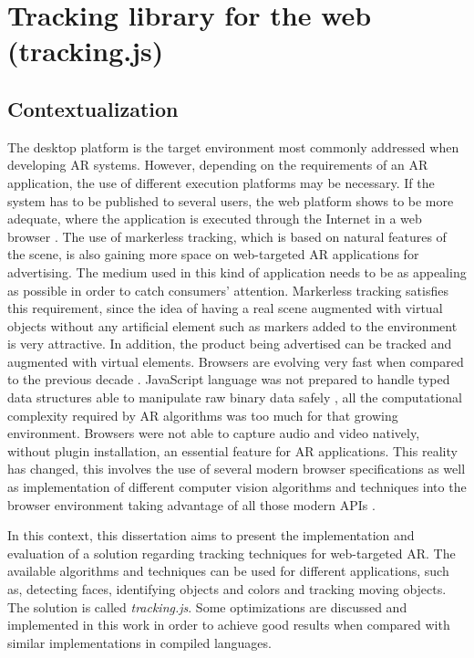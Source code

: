 \chapter{Tracking library for the web (tracking.js)} %
\label{cha:tracking_library_for_the_web}

\section{Contextualization} %
\label{sec:tracking_library_for_the_web:Contextualization}

The desktop platform is the target environment most commonly addressed when developing AR systems. However, depending on the requirements of an AR application, the use of different execution platforms may be necessary. If the system has to be published to several users, the web platform shows to be more adequate, where the application is executed through the Internet in a web browser \cite{Pablo2013}.
The use of markerless tracking, which is based on natural features of the scene, is also gaining more space on web-targeted AR applications for advertising. The medium used in this kind of application needs to be as appealing as possible in order to catch consumers' attention. Markerless tracking satisfies this requirement, since the idea of having a real scene augmented with virtual objects without any artificial element such as markers added to the environment is very attractive. In addition, the product being advertised can be tracked and augmented with virtual elements.
Browsers are evolving very fast when compared to the previous decade \cite{Hickson2013}. JavaScript language was not prepared to handle typed data structures \cite{TypedArray2013} able to manipulate raw binary data safely \cite{Canvas2013}, all the computational complexity required by AR algorithms was too much for that growing environment. Browsers were not able to capture audio and video \cite{MediaCapture2013,WebRTC2013} natively, without plugin installation, an essential feature for AR applications. This reality has changed, this involves the use of several modern browser specifications as well as implementation of different computer vision algorithms and techniques into the browser environment taking advantage of all those modern APIs \cite{Hickson2013,WC2006}.

In this context, this dissertation aims to present the implementation and evaluation of a solution regarding tracking techniques for web-targeted AR. The available algorithms and techniques can be used for different applications, such as, detecting faces, identifying objects and colors and tracking moving objects. The solution is called \textit{tracking.js}. Some optimizations are discussed and implemented in this work in order to achieve good results when compared with similar implementations in compiled languages.

